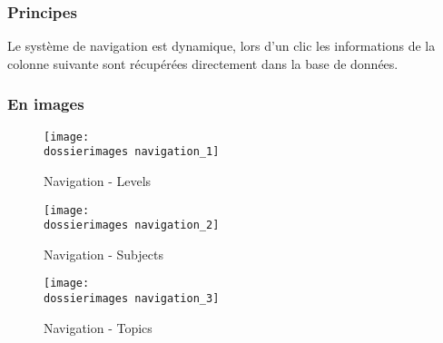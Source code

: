 \subsubsection{Principes}
Le système de navigation est dynamique, lors d'un clic les informations de la colonne suivante sont récupérées directement dans la base de données.

\subsubsection{En images}

\begin{figure}[H]
   	\begin{minipage}[c]{.46\linewidth}
		\texttt{[image: \\dossierimages navigation\_1]}
		\caption{Navigation - Levels}
		\label{Navigation - Levels}
   	\end{minipage} \hfill
  	\begin{minipage}[c]{.46\linewidth}
      	\texttt{[image: \\dossierimages navigation\_2]}
     	\caption{Navigation - Subjects}
		\label{Navigation - Subjects}
   	\end{minipage}
\end{figure}
\begin{figure}[H]
   	\begin{minipage}[c]{.46\linewidth}
		\texttt{[image: \\dossierimages navigation\_3]}
		\caption{Navigation - Topics}
		\label{Navigation - Topics}
   	\end{minipage} \hfill
  	\begin{minipage}[c]{.46\linewidth}
      	
   	\end{minipage}
\end{figure}
